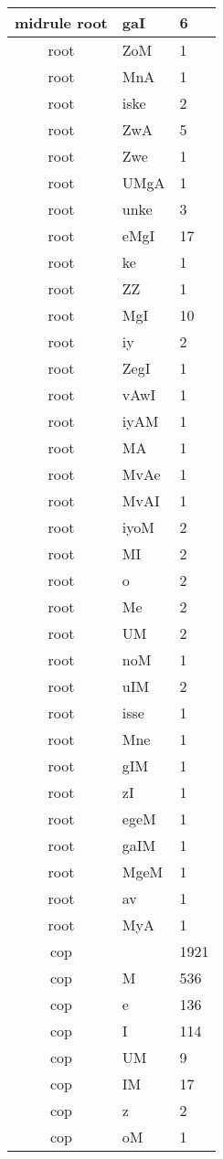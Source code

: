 \documentclass[a4 paper]{article}
\begin{document}
\begin{longtable}{cp{}p{}}
midrule root & gaI & 6\\ \midrule root & ZoM & 1\\ \midrule root & MnA & 1\\ \midrule root & iske & 2\\ \midrule root & ZwA & 5\\ \midrule root & Zwe & 1\\ \midrule root & UMgA & 1\\ \midrule root & unke & 3\\ \midrule root & eMgI & 17\\ \midrule root & ke & 1\\ \midrule root & ZZ & 1\\ \midrule root & MgI & 10\\ \midrule root & iy & 2\\ \midrule root & ZegI & 1\\ \midrule root & vAwI & 1\\ \midrule root & iyAM & 1\\ \midrule root & MA & 1\\ \midrule root & MvAe & 1\\ \midrule root & MvAI & 1\\ \midrule root & iyoM & 2\\ \midrule root & MI & 2\\ \midrule root & o & 2\\ \midrule root & Me & 2\\ \midrule root & UM & 2\\ \midrule root & noM & 1\\ \midrule root & uIM & 2\\ \midrule root & isse & 1\\ \midrule root & Mne & 1\\ \midrule root & gIM & 1\\ \midrule root & zI & 1\\ \midrule root & egeM & 1\\ \midrule root & gaIM & 1\\ \midrule root & MgeM & 1\\ \midrule root & av & 1\\ \midrule root & MyA & 1\\ \midrule 
cop &  & 1921\\ \midrule cop & M & 536\\ \midrule cop & e & 136\\ \midrule cop & I & 114\\ \midrule cop & UM & 9\\ \midrule cop & IM & 17\\ \midrule cop & z & 2\\ \midrule cop & oM & 1\\ \midrule 

\end{longtable}
\end{document}

